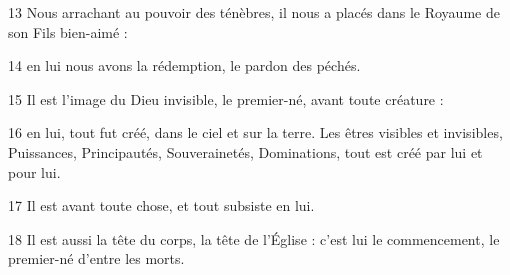
13 Nous arrachant au pouvoir des ténèbres, il nous a placés dans le Royaume de son Fils bien-aimé :

14 en lui nous avons la rédemption, le pardon des péchés.

15 Il est l’image du Dieu invisible, le premier-né, avant toute créature :

16 en lui, tout fut créé, dans le ciel et sur la terre. Les êtres visibles et invisibles, Puissances, Principautés, Souverainetés, Dominations, tout est créé par lui et pour lui.

17 Il est avant toute chose, et tout subsiste en lui.

18 Il est aussi la tête du corps, la tête de l’Église : c’est lui le commencement, le premier-né d’entre les morts.
